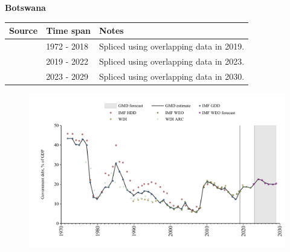 \documentclass[12pt,a4paper,landscape]{article}
\begin{document}
\begin{adjustbox}{max totalsize={\paperwidth}{\paperheight},center}
\begin{minipage}[t][\textheight][t]{\textwidth}
\vspace*{0.5cm}
{}
\begin{center}
{\Large\bfseries Botswana}
\end{center}
\vspace{0.5cm}
\begin{table}[H]
\centering
\small
\begin{tabular}{|l|l|l|}
\hline
\textbf{Source} & \textbf{Time span} & \textbf{Notes} \\
\hline
\rowcolor{white}\cite{IMF_GDD}& 1972 - 2018 &Spliced using overlapping data in 2019.\\
\rowcolor{lightgray}\cite{IMF_WEO}& 2019 - 2022 &Spliced using overlapping data in 2023.\\
\rowcolor{white}\cite{IMF_WEO_forecast}& 2023 - 2029 &Spliced using overlapping data in 2030.\\
\hline
\end{tabular}
\end{table}
\begin{figure}[H]
\centering
\includegraphics[width=\textwidth,height=0.6\textheight,keepaspectratio]{graphs/BWA_govdebt_GDP.pdf}
\end{figure}
\end{minipage}
\end{adjustbox}
\end{document}
